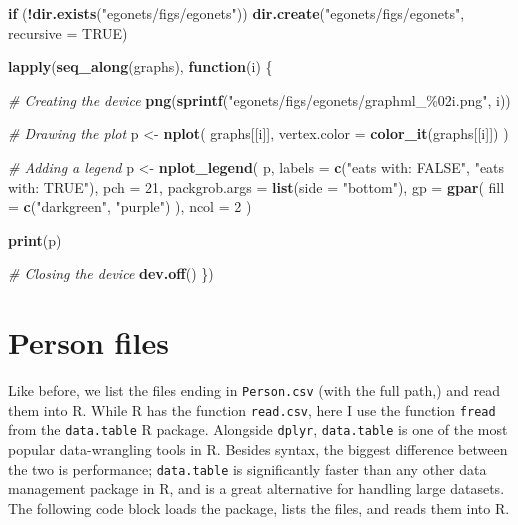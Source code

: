 \documentclass[
]{book}
\newenvironment{Shaded}{\begin{snugshade}}{\end{snugshade}}
\newcommand{\AttributeTok}[1]{\textcolor[rgb]{0.13,0.29,0.53}{#1}}
\newcommand{\CommentTok}[1]{\textcolor[rgb]{0.56,0.35,0.01}{\textit{#1}}}
\newcommand{\ConstantTok}[1]{\textcolor[rgb]{0.56,0.35,0.01}{#1}}
\newcommand{\ControlFlowTok}[1]{\textcolor[rgb]{0.13,0.29,0.53}{\textbf{#1}}}
\newcommand{\DecValTok}[1]{\textcolor[rgb]{0.00,0.00,0.81}{#1}}
\newcommand{\FunctionTok}[1]{\textcolor[rgb]{0.13,0.29,0.53}{\textbf{#1}}}
\newcommand{\NormalTok}[1]{#1}
\newcommand{\OtherTok}[1]{\textcolor[rgb]{0.56,0.35,0.01}{#1}}
\newcommand{\SpecialCharTok}[1]{\textcolor[rgb]{0.81,0.36,0.00}{\textbf{#1}}}
\newcommand{\StringTok}[1]{\textcolor[rgb]{0.31,0.60,0.02}{#1}}
\begin{document}
\begin{Shaded}
\begin{Highlighting}[]
\ControlFlowTok{if}\NormalTok{ (}\SpecialCharTok{!}\FunctionTok{dir.exists}\NormalTok{(}\StringTok{"egonets/figs/egonets"}\NormalTok{))}
  \FunctionTok{dir.create}\NormalTok{(}\StringTok{"egonets/figs/egonets"}\NormalTok{, }\AttributeTok{recursive =} \ConstantTok{TRUE}\NormalTok{)}

\FunctionTok{lapply}\NormalTok{(}\FunctionTok{seq\_along}\NormalTok{(graphs), }\ControlFlowTok{function}\NormalTok{(i) \{}
  
  \CommentTok{\# Creating the device }
  \FunctionTok{png}\NormalTok{(}\FunctionTok{sprintf}\NormalTok{(}\StringTok{"egonets/figs/egonets/graphml\_\%02i.png"}\NormalTok{, i))  }
  
  \CommentTok{\# Drawing the plot}
\NormalTok{  p }\OtherTok{\textless{}{-}} \FunctionTok{nplot}\NormalTok{(}
\NormalTok{    graphs[[i]],}
    \AttributeTok{vertex.color =} \FunctionTok{color\_it}\NormalTok{(graphs[[i]])}
\NormalTok{    )}
  
  \CommentTok{\# Adding a legend}
\NormalTok{  p }\OtherTok{\textless{}{-}} \FunctionTok{nplot\_legend}\NormalTok{(}
\NormalTok{    p,}
    \AttributeTok{labels =} \FunctionTok{c}\NormalTok{(}\StringTok{"eats with: FALSE"}\NormalTok{, }\StringTok{"eats with: TRUE"}\NormalTok{),}
    \AttributeTok{pch    =} \DecValTok{21}\NormalTok{,}
    \AttributeTok{packgrob.args =} \FunctionTok{list}\NormalTok{(}\AttributeTok{side =} \StringTok{"bottom"}\NormalTok{),}
    \AttributeTok{gp            =} \FunctionTok{gpar}\NormalTok{(}
      \AttributeTok{fill =} \FunctionTok{c}\NormalTok{(}\StringTok{"darkgreen"}\NormalTok{, }\StringTok{"purple"}\NormalTok{)}
\NormalTok{    ),}
    \AttributeTok{ncol =} \DecValTok{2}
\NormalTok{  )}
  
  \FunctionTok{print}\NormalTok{(p)}
  
  \CommentTok{\# Closing the device}
  \FunctionTok{dev.off}\NormalTok{()}
\NormalTok{\})}
\end{Highlighting}
\end{Shaded}

\hypertarget{person-files}{%
\section{Person files}\label{person-files}}

Like before, we list the files ending in \texttt{Person.csv} (with the full path,) and read them into R. While R has the function \texttt{read.csv}, here I use the function \texttt{fread} from the \texttt{data.table} R package. Alongside \texttt{dplyr}, \texttt{data.table} is one of the most popular data-wrangling tools in R. Besides syntax, the biggest difference between the two is performance; \texttt{data.table} is significantly faster than any other data management package in R, and is a great alternative for handling large datasets. The following code block loads the package, lists the files, and reads them into R.
\end{document}
